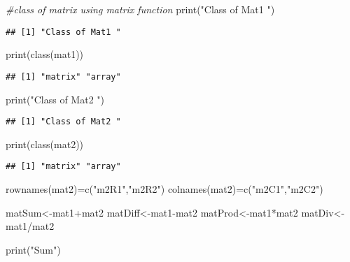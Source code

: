 \documentclass[
]{article}
\newenvironment{Shaded}{\begin{snugshade}}{\end{snugshade}}
\newcommand{\CommentTok}[1]{\textcolor[rgb]{0.56,0.35,0.01}{\textit{#1}}}
\newcommand{\FunctionTok}[1]{\textcolor[rgb]{0.00,0.00,0.00}{#1}}
\newcommand{\NormalTok}[1]{#1}
\newcommand{\OtherTok}[1]{\textcolor[rgb]{0.56,0.35,0.01}{#1}}
\newcommand{\SpecialCharTok}[1]{\textcolor[rgb]{0.00,0.00,0.00}{#1}}
\newcommand{\StringTok}[1]{\textcolor[rgb]{0.31,0.60,0.02}{#1}}
\begin{document}
\begin{Shaded}
\begin{Highlighting}[]
\CommentTok{\#class of matrix using matrix function}
\FunctionTok{print}\NormalTok{(}\StringTok{"Class of Mat1 "}\NormalTok{)}
\end{Highlighting}
\end{Shaded}

\begin{verbatim}
## [1] "Class of Mat1 "
\end{verbatim}

\begin{Shaded}
\begin{Highlighting}[]
\FunctionTok{print}\NormalTok{(}\FunctionTok{class}\NormalTok{(mat1))}
\end{Highlighting}
\end{Shaded}

\begin{verbatim}
## [1] "matrix" "array"
\end{verbatim}

\begin{Shaded}
\begin{Highlighting}[]
\FunctionTok{print}\NormalTok{(}\StringTok{"Class of Mat2 "}\NormalTok{)}
\end{Highlighting}
\end{Shaded}

\begin{verbatim}
## [1] "Class of Mat2 "
\end{verbatim}

\begin{Shaded}
\begin{Highlighting}[]
\FunctionTok{print}\NormalTok{(}\FunctionTok{class}\NormalTok{(mat2))}
\end{Highlighting}
\end{Shaded}

\begin{verbatim}
## [1] "matrix" "array"
\end{verbatim}

\begin{Shaded}
\begin{Highlighting}[]
\FunctionTok{rownames}\NormalTok{(mat2)}\OtherTok{=}\FunctionTok{c}\NormalTok{(}\StringTok{"m2R1"}\NormalTok{,}\StringTok{"m2R2"}\NormalTok{)}
\FunctionTok{colnames}\NormalTok{(mat2)}\OtherTok{=}\FunctionTok{c}\NormalTok{(}\StringTok{"m2C1"}\NormalTok{,}\StringTok{"m2C2"}\NormalTok{)}


\NormalTok{matSum}\OtherTok{\textless{}{-}}\NormalTok{mat1}\SpecialCharTok{+}\NormalTok{mat2}
\NormalTok{matDiff}\OtherTok{\textless{}{-}}\NormalTok{mat1}\SpecialCharTok{{-}}\NormalTok{mat2}
\NormalTok{matProd}\OtherTok{\textless{}{-}}\NormalTok{mat1}\SpecialCharTok{*}\NormalTok{mat2}
\NormalTok{matDiv}\OtherTok{\textless{}{-}}\NormalTok{mat1}\SpecialCharTok{/}\NormalTok{mat2}

\FunctionTok{print}\NormalTok{(}\StringTok{"Sum"}\NormalTok{)}
\end{Highlighting}
\end{Shaded}
\end{document}
